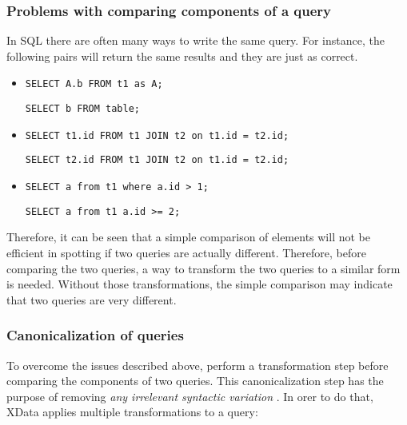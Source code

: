 \subsubsection{Problems with comparing components of a query}

In SQL there are often many ways to write the same query.
For instance, the following pairs will return the same results and they are
just as correct.

\begin{itemize}
  \item \texttt{SELECT A.b FROM t1 as A;}

  \texttt{SELECT b FROM table;}
  \item \texttt{SELECT t1.id FROM t1 JOIN t2 on t1.id = t2.id;}

  \texttt{SELECT t2.id FROM t1 JOIN t2 on t1.id = t2.id;}
  \item \texttt{SELECT a from t1 where a.id > 1;}

  \texttt{SELECT a from t1 a.id >= 2;}
\end{itemize}

Therefore, it can be seen that a simple comparison of elements will not be efficient in spotting if two queries are actually different. Therefore, before comparing the two queries, a way to transform the two queries to a similar form is needed. Without those transformations, the simple comparison may indicate
that two queries are very different.

\subsubsection{Canonicalization of queries} \label{ch:lit:sec:canonicalization}

To overcome the issues described above, \cite{literature:xdata} perform a transformation step before comparing the components of two queries. This canonicalization step has the purpose of removing \textit{any irrelevant syntactic variation} \citep{literature:xdata}. In orer to do that, XData applies multiple transformations to a query:

